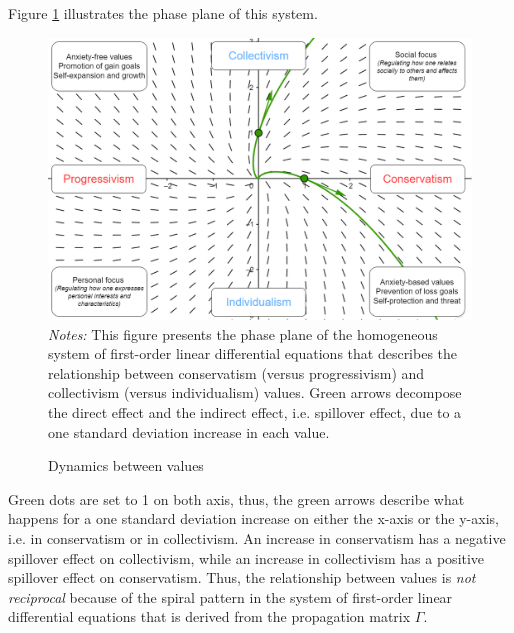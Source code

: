 Figure \ref{chap3-fig:phase-plane} illustrates the phase plane of this system.
\begin{figure}[!tb]
    \centering
    \caption{Dynamics between values}
    \label{chap3-fig:phase-plane}
    \includegraphics[width=\linewidth]{chap3/graphic/sys-diff-eq-plus.png}
	\vspace{-3em}
	\justify\singlespacing\footnotesize{\textit{Notes:} This figure presents the phase plane of the homogeneous system of first-order linear differential equations that describes the relationship between conservatism (versus progressivism) and collectivism (versus individualism) values. Green arrows decompose the direct effect and the indirect effect, i.e. spillover effect, due to a one standard deviation increase in each value.}
\end{figure}
Green dots are set to 1 on both axis, thus, the green arrows describe what happens for a one standard deviation increase on either the x-axis or the y-axis, i.e. in conservatism or in collectivism. An increase in conservatism has a negative spillover effect on collectivism, while an increase in collectivism has a positive spillover effect on conservatism. Thus, the relationship between values is \textit{not reciprocal} because of the spiral pattern in the system of first-order linear differential equations that is derived from the propagation matrix $\Gamma$.

